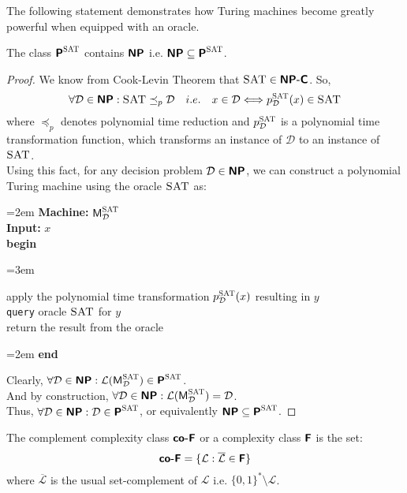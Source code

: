 \documentclass[usletter]{article}
\newcommand {\langset}[1]      {\ensuremath{\mathcal{#1}}}
\newcommand {\namedlangset}[1] {\ensuremath{\textnormal{\textsc{#1}}}}
\newcommand {\machine}[1]      {\ensuremath{\textnormal{\textsf{#1}}}}
\newcommand {\family}[1]       {\ensuremath{\textnormal{\textsf{\textbf{#1}}}}}
\newcommand {\term}[1]      {\textsf{#1}}
\newcommand {\namethm}[1]   {\term{#1} Theorem}
\newenvironment{turing}[2]{
  \par\smallskip\leftskip=2em
  \noindent\ignorespaces
  \textbf{Machine:} #1\\
  \textbf{Input:} #2\\[5pt]
  \textbf{begin}
  \par\leftskip=3em
  \noindent\ignorespaces
}{
  \par\leftskip=2em
  \noindent\ignorespaces
  \textbf{end}
  \par\medskip
}
\begin{document}
\noindent
The following statement demonstrates how Turing machines become greatly powerful
when equipped with an oracle.

\begin{proposition}
\label{NP_in_PSAT_proposition}
The class $\family{P}^\namedlangset{SAT}$ contains \family{NP} i.e.
$\family{NP} \subseteq \family{P}^\namedlangset{SAT}$.
\end{proposition}

\begin{proof}
We know from \namethm{Cook-Levin} that $\namedlangset{SAT} \in \family{NP-C}$.
So, $$\forall \langset{D} \in \family{NP}
  : \namedlangset{SAT} \preceq_p \langset{D} \quad
  i.e. \quad x \in \langset{D} \Longleftrightarrow
       p_\langset{D}^\namedlangset{SAT}(x) \in \namedlangset{SAT}$$
where $\preceq_p$ denotes polynomial time reduction and
$p_\langset{D}^\namedlangset{SAT}$ is a polynomial time transformation function,
which transforms an instance of \langset{D} to an instance of
\namedlangset{SAT}. \\

\noindent
Using this fact, for any decision problem $\langset{D} \in \family{NP}$, we can
construct a polynomial Turing machine using the oracle \namedlangset{SAT} as:
\begin{turing}{$\machine{M}^\namedlangset{SAT}_\langset{D}$}{$x$}
  apply the polynomial time transformation $p_\langset{D}^\namedlangset{SAT}(x)$
  resulting in $y$\\
  \texttt{query} oracle \namedlangset{SAT} for $y$ \\
  return the result from the oracle
\end{turing}

\noindent
Clearly, $\forall \langset{D} \in \family{NP}
: \langset{L}(\machine{M}^\namedlangset{SAT}_\langset{D})
  \in \family{P}^\namedlangset{SAT}$. \\
And by construction, $\forall \langset{D} \in \family{NP}
  : \langset{L}(\machine{M}^\namedlangset{SAT}_\langset{D}) = \langset{D}$. \\

\noindent
Thus, $\forall \langset{D} \in \family{NP}
  : \langset{D} \in \family{P}^\namedlangset{SAT}$, or equivalently
$ \family{NP} \subseteq \family{P}^\namedlangset{SAT}$.
\end{proof}

\begin{definition}
The complement complexity class \family{co-F} or a complexity class \family{F}
is the set:
$$ \family{co-F} = \{ \langset{L} : \overline{\langset{L}} \in \family{F} \} $$
where $\overline{\langset{L}}$ is the usual set-complement of \langset{L}
i.e. $\{0,1\}^* \setminus \langset{L}$.
\end{definition}
\end{document}
